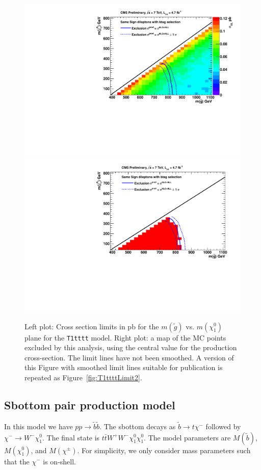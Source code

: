 \begin{figure}[htb]
\begin{center}
\includegraphics[width=0.48\linewidth]{figs/T1tttt_LimitsOnCarpet.pdf}
\includegraphics[width=0.48\linewidth]{figs/T1tttt_ExcludedRegionMap.pdf}
\caption{
Left plot: Cross section limits in pb for the $m(\widetilde{g})$ vs. 
$m(\chi_1^0)$ plane for the
{\tt T1tttt} model.  Right plot: a map of the MC points excluded by this
analysis, using the central value for the production cross-section.
The limit lines have not been smoothed.
A version of this Figure with smoothed limit lines suitable for 
publication is repeated as Figure~\ref{fig:T1ttttLimit2}.\label{fig:T1ttttLimit}}
\end{center}
\end{figure}



\clearpage

\subsection{Sbottom pair production model}
\label{sec:sbottompair}
In this model we have $pp \to \tilde{b}\tilde{b}$.  The sbottom decays 
as $\tilde{b} \to t\chi^{-}$ followed by $\chi^{-} \to W^- \chi_1^0$. 
The final state is $t\bar{t}W^+W^- \chi_1^0 \chi_1^0$. 
The model parameters are $M(\widetilde{b})$, $M(\chi_1^0)$, and $M(\chi^{\pm})$.
For simplicity, we only consider mass parameters such that the $\chi^{-}$ is on-shell.

